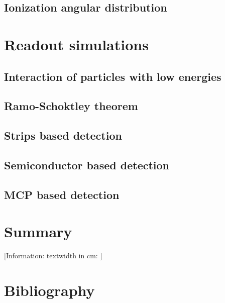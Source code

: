 \begin{refsection}
	\subsection{Ionization angular distribution}

	\section{Readout simulations}
	\subsection{Interaction of particles with low energies}
	
	\subsection{Ramo-Schoktley theorem}
	\cite[]{Ramo_1939}\cite[]{Shockley_1938}\cite[]{Cavalleri1971}\cite[]{Jen1941}
	\subsection{Strips based detection}
	\subsection{Semiconductor based detection}
	\subsection{MCP based detection}

	\section{Summary}
	\label{ch3:Summary}
	[Information: textwidth in cm: \prntlen{\textwidth}]

	\cleardoublepage
	\section{Bibliography}
	\label{ch3:bib}
	\printbibliography[heading=subbibliography]

\end{refsection}